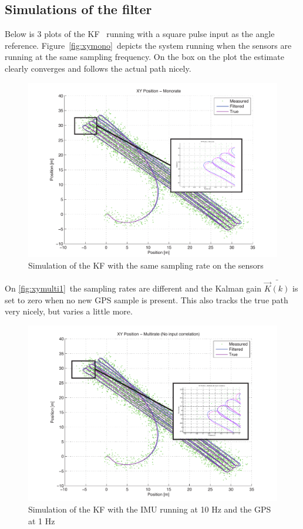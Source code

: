 \subsection{Simulations of the filter}
Below is 3 plots of the \ac{KF}  running with a square pulse input as the angle reference. Figure \vref{fig:xymono} depicts the system running when the sensors are running at the same sampling frequency. On the box on the plot the estimate clearly converges and follows the actual path nicely. 

\begin{figure}[htbp]
	\centering
	\includegraphics[width=\textwidth]{img/xymono}
	\caption{Simulation of the \ac{KF} with the same sampling rate on the sensors}
	\label{fig:xymono}
\end{figure}

On \vref{fig:xymulti1} the sampling rates are different and the Kalman gain $\bar{\vec{K}(k)}$ is set to zero when no new \ac{GPS} sample is present. This also tracks the true path very nicely, but varies a little more. 

\begin{figure}[htbp]
	\centering
	\includegraphics[width=\textwidth]{img/xymultirate}
	\caption{Simulation of the \ac{KF} with the \ac{IMU} running at 10 Hz and the \ac{GPS} at 1 Hz}
	\label{fig:xymulti1}
\end{figure}

